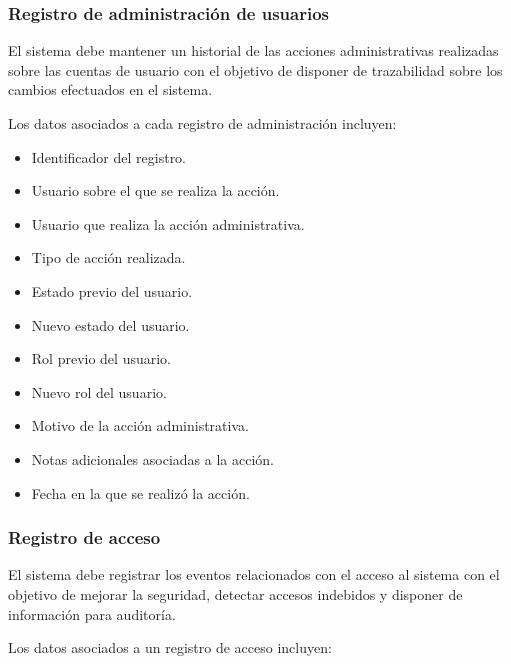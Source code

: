 \subsubsection*{Registro de administración de usuarios}

El sistema debe mantener un historial de las acciones administrativas realizadas sobre las cuentas de usuario con el objetivo de disponer de trazabilidad sobre los cambios efectuados en el sistema.

Los datos asociados a cada registro de administración incluyen:

\begin{itemize}
    \item Identificador del registro.
    \item Usuario sobre el que se realiza la acción.
    \item Usuario que realiza la acción administrativa.
    \item Tipo de acción realizada.
    \item Estado previo del usuario.
    \item Nuevo estado del usuario.
    \item Rol previo del usuario.
    \item Nuevo rol del usuario.
    \item Motivo de la acción administrativa.
    \item Notas adicionales asociadas a la acción.
    \item Fecha en la que se realizó la acción.
\end{itemize}

\subsubsection*{Registro de acceso}

El sistema debe registrar los eventos relacionados con el acceso al sistema con el objetivo de mejorar la seguridad, detectar accesos indebidos y disponer
de información para auditoría.

Los datos asociados a un registro de acceso incluyen:

